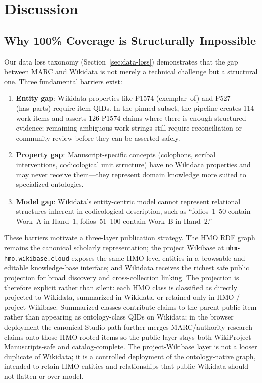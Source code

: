 \documentclass[Afour,sageh,times]{sagej}
\begin{document}
\section{Discussion}
\label{sec:discussion}

\subsection{Why 100\% Coverage is Structurally Impossible}

Our data loss taxonomy (Section~\ref{sec:data-loss}) demonstrates that the gap between MARC and Wikidata is not merely a technical challenge but a structural one. Three fundamental barriers exist:

\begin{enumerate}[leftmargin=*]
\item \textbf{Entity gap}: Wikidata properties like P1574 (exemplar~of) and P527 (has~parts) require item QIDs. In the pinned subset, the pipeline creates 114 work items and asserts 126 P1574 claims where there is enough structured evidence; remaining ambiguous work strings still require reconciliation or community review before they can be asserted safely.
\item \textbf{Property gap}: Manuscript-specific concepts (colophons, scribal interventions, codicological unit structure) have no Wikidata properties and may never receive them---they represent domain knowledge more suited to specialized ontologies.
\item \textbf{Model gap}: Wikidata's entity-centric model cannot represent relational structures inherent in codicological description, such as ``folios~1--50 contain Work~A in Hand~1, folios~51--100 contain Work~B in Hand~2.''
\end{enumerate}

These barriers motivate a three-layer publication strategy. The HMO RDF graph remains the canonical scholarly representation; the project Wikibase at \texttt{mhm-hmo.wikibase.cloud} exposes the same HMO-level entities in a browsable and editable knowledge-base interface; and Wikidata receives the richest safe public projection for broad discovery and cross-collection linking. The projection is therefore explicit rather than silent: each HMO class is classified as directly projected to Wikidata, summarized in Wikidata, or retained only in HMO / project Wikibase. Summarized classes contribute claims to the parent public item rather than appearing as ontology-class QIDs on Wikidata; in the browser deployment the canonical Studio path further merges MARC/authority research claims onto those HMO-rooted items so the public layer stays both WikiProject-Manuscripts-safe and catalog-complete. The project-Wikibase layer is not a looser duplicate of Wikidata; it is a controlled deployment of the ontology-native graph, intended to retain HMO entities and relationships that public Wikidata should not flatten or over-model.
\end{document}
